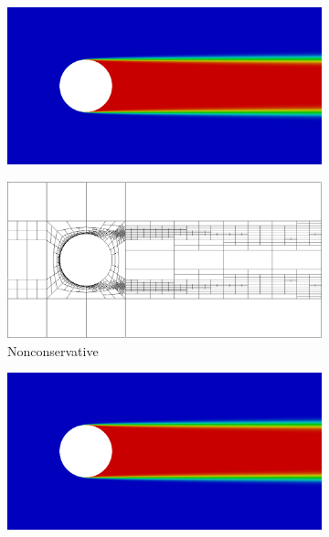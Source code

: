 \documentclass[letterpaper]{article}
\begin{document}
\begin{figure}[p]
\centering
\begin{subfigure}[t]{0.6\textwidth}
\centering
\includegraphics[width=\textwidth]{figs/Hemker/modified8nc.png}
\end{subfigure}
\begin{subfigure}[t]{0.6\textwidth}
\centering
\includegraphics[width=\textwidth]{figs/Hemker/modified8nc_mesh.png}
\caption{Nonconservative}
\label{fig:hemkerModified8nc}
\end{subfigure}
\begin{subfigure}[t]{0.6\textwidth}
\centering
\includegraphics[width=\textwidth]{figs/Hemker/modified8c.png}

\end{subfigure}
\end{figure}
\end{document}

